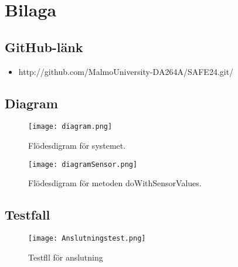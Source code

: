 
\chapter{Bilaga} %
\label{bilaga}

\ifpdf
    \graphicspath{{10_bilaga/figures/PNG/}{10/figures/PDF/}{10/figures/}}
\else
    \graphicspath{{10_bilaga/figures/EPS/}{10/figures/}}
\fi

\graphicspath{{10_bilaga/figures/}{10/figures/}}



\section{GitHub-länk}

\begin{itemize}
\item http://github.com/MalmoUniversity-DA264A/SAFE24.git/
\end{itemize}


\section{Diagram}

\begin{figure}[h]
  \texttt{[image: diagram.png]}
  \caption{Flödesdigram för systemet.}
  \label{fig:diagram}
\end{figure}

\begin{figure}[h]
  \texttt{[image: diagramSensor.png]}
  \caption{Flödesdigram för metoden doWithSensorValues.}
  \label{fig:diagramSensor}
\end{figure}

\section{Testfall}

\begin{figure}[h]
  \texttt{[image: Anslutningstest.png]}
  \caption{Testfll för anslutning}
  \label{fig:Anslutningstest}
\end{figure}

